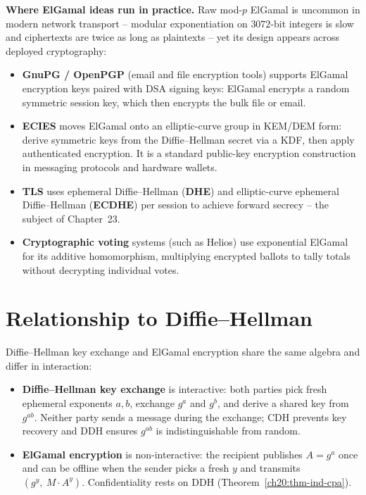 \begin{applicationbox}
\textbf{Where ElGamal ideas run in practice.} Raw mod-$p$ ElGamal is uncommon in modern network transport -- modular exponentiation on $3072$-bit integers is slow and ciphertexts are twice as long as plaintexts -- yet its design appears across deployed cryptography:
\begin{itemize}
  \item \textbf{GnuPG / OpenPGP} (email and file encryption tools) supports ElGamal encryption keys paired with DSA
    signing keys: ElGamal encrypts a random symmetric session key, which then encrypts the bulk file or email.
  \item \textbf{ECIES} moves ElGamal onto an elliptic-curve group in KEM/DEM form: derive symmetric keys from the Diffie--Hellman secret via a KDF, then apply authenticated encryption. It is a standard public-key encryption construction in messaging protocols and hardware wallets.
  \item \textbf{TLS} uses ephemeral Diffie--Hellman (\textbf{DHE}) and elliptic-curve ephemeral Diffie--Hellman (\textbf{ECDHE}) per session to achieve forward secrecy -- the subject of Chapter~23.
  \item \textbf{Cryptographic voting} systems (such as Helios) use exponential ElGamal for its additive homomorphism, multiplying encrypted ballots to tally totals without decrypting individual votes.
\end{itemize}
\end{applicationbox}

\section{Relationship to Diffie--Hellman}
\label{ch20:dh-relationship}

Diffie--Hellman key exchange and ElGamal encryption share the same algebra and differ in interaction:

\begin{itemize}
  \item \textbf{Diffie--Hellman key exchange} is interactive: both parties pick fresh ephemeral exponents $a, b$, exchange $g^a$ and $g^b$, and derive a shared key from $g^{ab}$. Neither party sends a message during the exchange; CDH prevents key recovery and DDH ensures $g^{ab}$ is indistinguishable from random.
  \item \textbf{ElGamal encryption} is non-interactive: the recipient publishes $A = g^a$ once and can be offline when the sender picks a fresh $y$ and transmits $(g^y,\ M \cdot A^y)$. Confidentiality rests on DDH (Theorem~\ref{ch20:thm-ind-cpa}).
\end{itemize}

